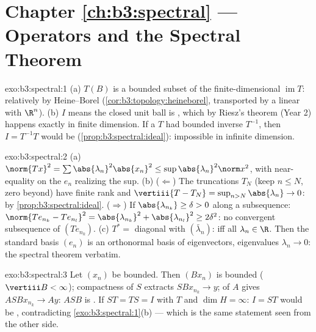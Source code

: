 \section*{Chapter \ref{ch:b3:spectral} ---  Operators
and the Spectral Theorem}

\begin{solution}{exo:b3:spectral:1}
(a) $T(B)$ is a bounded subset of the finite-dimensional
$\operatorname{im}T$: relatively  by Heine--Borel
(\cref{cor:b3:topology:heineborel}, transported by a linear
 with $\R^n$).
(b) $I$  means the closed unit ball is , which
by Riesz's theorem (Year 2) happens exactly in finite
dimension. If a  $T$ had bounded inverse $T^{-1}$, then
$I = T^{-1}T$ would be 
(\cref{prop:b3:spectral:ideal}): impossible in infinite
dimension.
\end{solution}

\begin{solution}{exo:b3:spectral:2}
(a) $\norm{Tx}^2 = \sum\abs{\lambda_n}^2\abs{x_n}^2 \leq
\sup\abs{\lambda_n}^2\norm x^2$, with near-equality on the
$e_n$ realizing the sup.
(b) ($\Leftarrow$) The truncations $T_N$ (keep $n \leq N$,
zero beyond) have finite rank and $\vertiii{T - T_N} =
\sup_{n>N}\abs{\lambda_n} \to 0$:  by
\cref{prop:b3:spectral:ideal}. ($\Rightarrow$) If
$\abs{\lambda_{n_k}} \geq \delta > 0$ along a subsequence:
$\norm{Te_{n_k} - Te_{n_l}}^2 = \abs{\lambda_{n_k}}^2 +
\abs{\lambda_{n_l}}^2 \geq 2\delta^2$: no convergent
subsequence of $(Te_{n_k})$.
(c) $T^* = $ diagonal with $(\bar\lambda_n)$:  iff
all $\lambda_n \in \R$. Then the standard basis $(e_n)$ is an
orthonormal basis of eigenvectors, eigenvalues $\lambda_n \to
0$: the spectral theorem verbatim.
\end{solution}

\begin{solution}{exo:b3:spectral:3}
Let $(x_n)$ be bounded. Then $(Bx_n)$ is bounded
($\vertiii B < \infty$); compactness of $S$ extracts
$SBx_{n_k} \to y$;  of $A$ gives $ASBx_{n_k} \to
Ay$: $ASB$ is . If $ST = TS = I$ with $T$  and
$\dim H = \infty$: $I = ST$ would be , contradicting
\cref{exo:b3:spectral:1}(b) --- which is the same statement
seen from the other side.
\end{solution}

